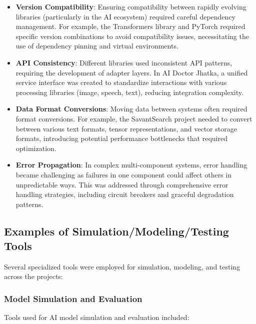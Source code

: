 \documentclass[12pt,a4paper]{article}
\begin{document}
\begin{itemize}
    \item \textbf{Version Compatibility}: Ensuring compatibility between rapidly evolving libraries (particularly in the AI ecosystem) required careful dependency management. For example, the Transformers library and PyTorch required specific version combinations to avoid compatibility issues, necessitating the use of dependency pinning and virtual environments.
    
    \item \textbf{API Consistency}: Different libraries used inconsistent API patterns, requiring the development of adapter layers. In AI Doctor Jhatka, a unified service interface was created to standardize interactions with various processing libraries (image, speech, text), reducing integration complexity.
    
    \item \textbf{Data Format Conversions}: Moving data between systems often required format conversions. For example, the SavantSearch project needed to convert between various text formats, tensor representations, and vector storage formats, introducing potential performance bottlenecks that required optimization.
    
    \item \textbf{Error Propagation}: In complex multi-component systems, error handling became challenging as failures in one component could affect others in unpredictable ways. This was addressed through comprehensive error handling strategies, including circuit breakers and graceful degradation patterns.
\end{itemize}

\subsection{Examples of Simulation/Modeling/Testing Tools}

Several specialized tools were employed for simulation, modeling, and testing across the projects:

\subsubsection{Model Simulation and Evaluation}
Tools used for AI model simulation and evaluation included:
\end{document}
